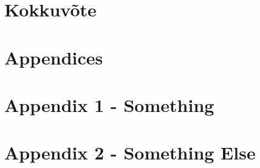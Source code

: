 \documentclass[12pt, a4paper]{report}
\begin{document}
\chapter{Kokkuvõte}\label{chapter:summary} 


\pagebreak
{}
{}
\printbibliography

\pagebreak
{}
\appendix
{}
\chapter*{Appendices}
\renewcommand{\thechapter}{\arabic{chapter}}

\label{chapter:appendix-one}
{\let\clearpage\relax\chapter*{Appendix 1 - Something}}


\clearpage
{}
{}\label{chapter:appendix-something-else}
\chapter*{Appendix 2 - Something Else}

\end{document}
